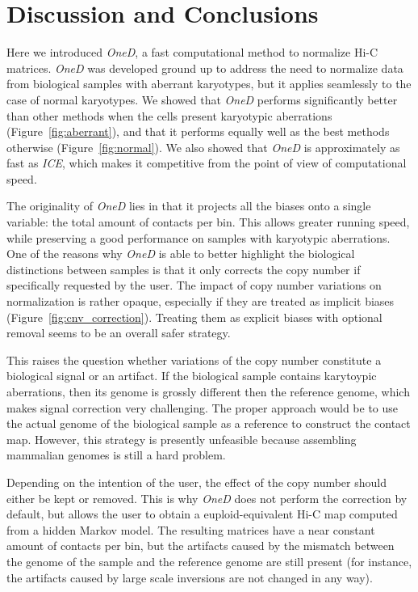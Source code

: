 \documentclass{bioinfo}
\begin{document}

\section{Discussion and Conclusions}

Here we introduced \textit{OneD}, a fast computational method to normalize
Hi-C matrices. \textit{OneD} was developed ground up to address the need
to normalize data from biological samples with aberrant karyotypes, but it
applies seamlessly to the case of normal karyotypes. We showed that
\textit{OneD} performs significantly better than other methods when the
cells present karyotypic aberrations (Figure~\ref{fig:aberrant}), and that
it performs equally well as the best methods otherwise
(Figure~\ref{fig:normal}). We also showed that \textit{OneD} is
approximately as fast as \textit{ICE}, which makes it competitive from the
point of view of computational speed.

The originality of \textit{OneD} lies in that it projects all the biases
onto a single variable: the total amount of contacts per bin. This allows
greater running speed, while preserving a good performance on samples with
karyotypic aberrations. One of the reasons why \textit{OneD} is able to
better highlight the biological distinctions between samples is that it
only corrects the copy number if specifically requested by the user. The
impact of copy number variations on normalization is rather opaque,
especially if they are treated as implicit biases
(Figure~\ref{fig:cnv_correction}). Treating them as explicit biases with
optional removal seems to be an overall safer strategy.

This raises the question whether variations of the copy number constitute
a biological signal or an artifact. If the biological sample contains
karytoypic aberrations, then its genome is grossly different then the
reference genome, which makes signal correction very challenging. The
proper approach would be to use the actual genome of the biological sample
as a reference to construct the contact map. However, this strategy is
presently unfeasible because assembling mammalian genomes is still a hard
problem.

Depending on the intention of the user, the effect of the copy number
should either be kept or removed. This is why \textit{OneD} does not
perform the correction by default, but allows the user to obtain a
euploid-equivalent Hi-C map computed from a hidden Markov model. The
resulting matrices have a near constant amount of contacts per bin, but
the artifacts caused by the mismatch between the genome of the sample and
the reference genome are still present (for instance, the artifacts caused
by large scale inversions are not changed in any way).
\end{document}
